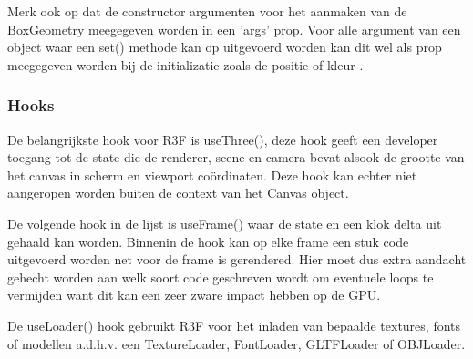 Merk ook op dat de constructor argumenten voor het aanmaken van de BoxGeometry meegegeven worden in een 'args' prop. Voor alle argument van een object waar een set() methode kan op uitgevoerd worden kan dit wel als prop meegegeven worden bij de initializatie zoals de positie of kleur \autocite{reactThreeFiber2023}.

\subsubsection{Hooks}

De belangrijkste hook voor R3F is useThree(), deze hook geeft een developer toegang tot de state die de renderer, scene en camera bevat alsook de grootte van het canvas in scherm en viewport coördinaten. Deze hook kan echter niet aangeropen worden buiten de context van het Canvas object.

De volgende hook in de lijst is useFrame() waar de state en een klok delta uit gehaald kan worden. Binnenin de hook kan op elke frame een stuk code uitgevoerd worden net voor de frame is gerendered. Hier moet dus extra aandacht gehecht worden aan welk soort code geschreven wordt om eventuele loops te vermijden want dit kan een zeer zware impact hebben op de GPU.

De useLoader() hook gebruikt R3F voor het inladen van bepaalde textures, fonts of modellen a.d.h.v. een TextureLoader, FontLoader, GLTFLoader of OBJLoader.
